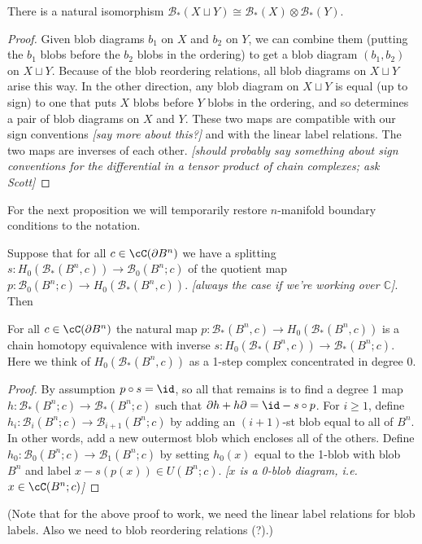 \documentclass[11pt,leqno]{amsart}
\def\bc{{\mathcal B}}
\def\c{\mathbb{C}}
\def\du{\sqcup}
\def\bd{\partial}
\def\nn#1{{{\it \small [#1]}}}
\begin{document}
\begin{prop} \label{disjunion}
There is a natural isomorphism $\bc_*(X \du Y) \cong \bc_*(X) \otimes \bc_*(Y)$.
\end{prop}
\begin{proof}
Given blob diagrams $b_1$ on $X$ and $b_2$ on $Y$, we can combine them
(putting the $b_1$ blobs before the $b_2$ blobs in the ordering) to get a
blob diagram $(b_1, b_2)$ on $X \du Y$.
Because of the blob reordering relations, all blob diagrams on $X \du Y$ arise this way.
In the other direction, any blob diagram on $X\du Y$ is equal (up to sign)
to one that puts $X$ blobs before $Y$ blobs in the ordering, and so determines
a pair of blob diagrams on $X$ and $Y$.
These two maps are compatible with our sign conventions \nn{say more about this?} and
with the linear label relations.
The two maps are inverses of each other.
\nn{should probably say something about sign conventions for the differential
in a tensor product of chain complexes; ask Scott}
\end{proof}

For the next proposition we will temporarily restore $n$-manifold boundary
conditions to the notation.

Suppose that for all $c \in \cC(\bd B^n)$
we have a splitting $s: H_0(\bc_*(B^n, c)) \to \bc_0(B^n; c)$
of the quotient map
$p: \bc_0(B^n; c) \to H_0(\bc_*(B^n, c))$.
\nn{always the case if we're working over $\c$}.
Then
\begin{prop} \label{bcontract}
For all $c \in \cC(\bd B^n)$ the natural map $p: \bc_*(B^n, c) \to H_0(\bc_*(B^n, c))$
is a chain homotopy equivalence
with inverse $s: H_0(\bc_*(B^n, c)) \to \bc_*(B^n; c)$.
Here we think of $H_0(\bc_*(B^n, c))$ as a 1-step complex concentrated in degree 0.
\end{prop}
\begin{proof}
By assumption $p\circ s = \id$, so all that remains is to find a degree 1 map
$h : \bc_*(B^n; c) \to \bc_*(B^n; c)$ such that $\bd h + h\bd = \id - s \circ p$.
For $i \ge 1$, define $h_i : \bc_i(B^n; c) \to \bc_{i+1}(B^n; c)$ by adding
an $(i{+}1)$-st blob equal to all of $B^n$.
In other words, add a new outermost blob which encloses all of the others.
Define $h_0 : \bc_0(B^n; c) \to \bc_1(B^n; c)$ by setting $h_0(x)$ equal to
the 1-blob with blob $B^n$ and label $x - s(p(x)) \in U(B^n; c)$.
\nn{$x$ is a 0-blob diagram, i.e. $x \in \cC(B^n; c)$}
\end{proof}

(Note that for the above proof to work, we need the linear label relations
for blob labels.
Also we need to blob reordering relations (?).)
\end{document}
